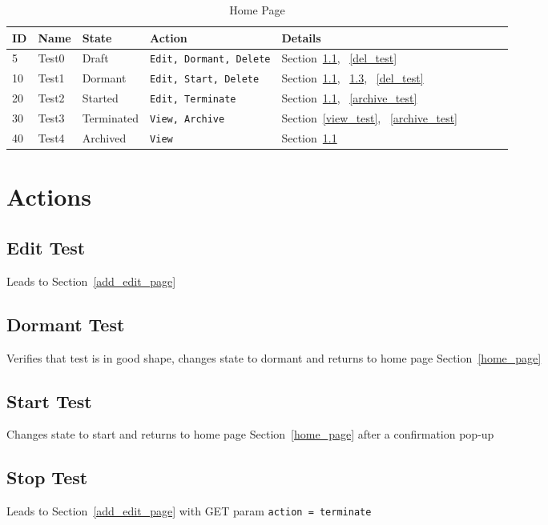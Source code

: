 \documentclass[letterpaper]{article}
\begin{document}
\begin{table}[hb]
\centering
\begin{tabular}{|l||l|l|l|l|l|l|l|l|}  \hline \hline
  {\bf ID} & {\bf Name} & {\bf State} & {\bf Action} & {\bf Details} \\ \hline \hline
  5 & Test0 & Draft & {\tt Edit, Dormant, Delete} & Section~\ref{edit_test},
  ~\ref{del_test} \\ \hline 
  10 & Test1 & Dormant & {\tt Edit, Start, Delete} &  
  Section~\ref{edit_test}, ~\ref{start_test}, ~\ref{del_test} \\ \hline 
  20 & Test2 & Started & {\tt Edit, Terminate} & 
  Section~\ref{edit_test}, ~\ref{archive_test} \\ \hline 
  30 & Test3 & Terminated & {\tt View, Archive} & 
  Section~\ref{view_test}, ~\ref{archive_test} \\ \hline 
  40 & Test4 & Archived & {\tt View}  &  Section~\ref{edit_test} \\ \hline
\hline
\end{tabular}
\caption{Home Page}
\label{tbl_home}
\end{table}


\section{Actions}
\subsection{Edit Test}
\label{edit_test}
Leads to Section~\ref{add_edit_page}

\subsection{Dormant Test}
\label{start_test}
Verifies that test is in good shape, changes state to dormant and returns to home page Section~\ref{home_page}

\subsection{Start Test}
\label{start_test}
Changes state to start and returns to home page Section~\ref{home_page} after a
confirmation pop-up

\subsection{Stop Test}
\label{stop_test}
Leads to Section~\ref{add_edit_page} with GET param {\tt action = terminate}
\end{document}
